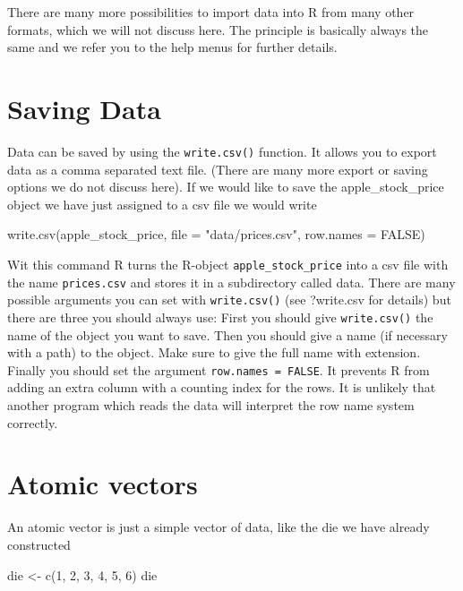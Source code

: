 \documentclass[
]{book}
\newenvironment{Shaded}{\begin{snugshade}}{\end{snugshade}}
\newcommand{\AttributeTok}[1]{\textcolor[rgb]{0.77,0.63,0.00}{#1}}
\newcommand{\ConstantTok}[1]{\textcolor[rgb]{0.00,0.00,0.00}{#1}}
\newcommand{\DecValTok}[1]{\textcolor[rgb]{0.00,0.00,0.81}{#1}}
\newcommand{\FunctionTok}[1]{\textcolor[rgb]{0.00,0.00,0.00}{#1}}
\newcommand{\NormalTok}[1]{#1}
\newcommand{\OtherTok}[1]{\textcolor[rgb]{0.56,0.35,0.01}{#1}}
\newcommand{\StringTok}[1]{\textcolor[rgb]{0.31,0.60,0.02}{#1}}
\begin{document}
There are many more possibilities to import data into R from many other formats, which we will
not discuss here. The principle is basically always the same and we refer you to the help menus
for further details.

\hypertarget{saving-data}{%
\section{Saving Data}\label{saving-data}}

Data can be saved by using the \texttt{write.csv()} function. It allows you to export data as a
comma separated text file. (There are many more export or saving options we do not discuss here).
If we would like to save the apple\_stock\_price object we have just assigned to a csv file we
would write

\begin{Shaded}
\begin{Highlighting}[]
\FunctionTok{write.csv}\NormalTok{(apple\_stock\_price, }\AttributeTok{file =} \StringTok{"data/prices.csv"}\NormalTok{, }\AttributeTok{row.names =} \ConstantTok{FALSE}\NormalTok{)}
\end{Highlighting}
\end{Shaded}

Wit this command R turns the R-object \texttt{apple\_stock\_price} into a csv file with the name
\texttt{prices.csv} and stores it in a subdirectory called data. There are many possible
arguments you can set with \texttt{write.csv()} (see ?write.csv for details) but there are three
you should always use: First you should give \texttt{write.csv()} the name of the object you want to
save. Then you should give a name (if necessary with a path) to the object. Make sure to give
the full name with extension. Finally you should set the argument \texttt{row.names\ =\ FALSE}. It prevents
R from adding an extra column with a counting index for the rows. It is unlikely that another
program which reads the data will interpret the row name system correctly.

\hypertarget{atomic-vectors}{%
\section{Atomic vectors}\label{atomic-vectors}}

An atomic vector is just a simple vector of data, like the die we have already constructed

\begin{Shaded}
\begin{Highlighting}[]
\NormalTok{die }\OtherTok{\textless{}{-}} \FunctionTok{c}\NormalTok{(}\DecValTok{1}\NormalTok{, }\DecValTok{2}\NormalTok{, }\DecValTok{3}\NormalTok{, }\DecValTok{4}\NormalTok{, }\DecValTok{5}\NormalTok{, }\DecValTok{6}\NormalTok{)}
\NormalTok{die}
\end{Highlighting}
\end{Shaded}
\end{document}
